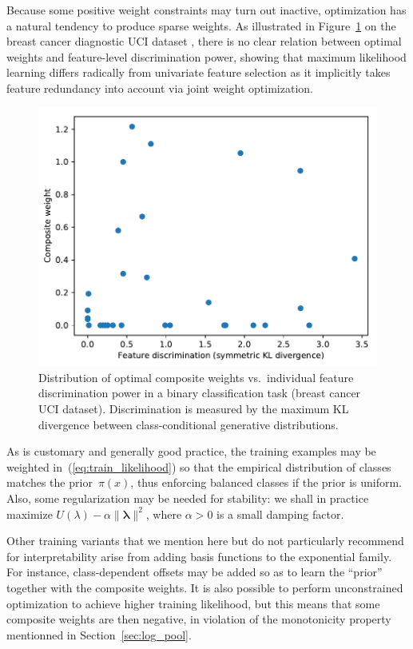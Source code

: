 \documentclass[english]{scrartcl}
\newcommand{\blambda}{{\boldsymbol{\lambda}}}
\begin{document}
Because some positive weight constraints may turn out inactive, optimization has a natural tendency to produce sparse weights. As illustrated in Figure~\ref{fig:disc_weight_plot} on the breast cancer diagnostic UCI dataset \cite{Wolberg-94}, there is no clear relation between optimal weights and feature-level discrimination power, showing that maximum likelihood learning differs radically from univariate feature selection as it implicitly takes feature redundancy into account via joint weight optimization.


\begin{figure}[!ht]
  \begin{center}
    \includegraphics[width=.6\textwidth]{disc_weight_plot.pdf}
  \end{center}
\caption{Distribution of optimal composite weights vs.~individual feature discrimination power in a binary classification task (breast cancer UCI dataset). Discrimination is measured by the maximum KL divergence between class-conditional generative distributions.}
\label{fig:disc_weight_plot}
\end{figure}

As is customary and generally good practice, the training examples may be weighted in~(\ref{eq:train_likelihood}) so that the empirical distribution of classes matches the prior~$\pi(x)$, thus enforcing balanced classes if the prior is uniform. Also, some regularization may be needed for stability: we shall in practice maximize $U(\lambda)-\alpha \|\blambda\|^2$, where $\alpha>0$ is a small damping factor.

Other training variants that we mention here but do not particularly recommend for interpretability arise from adding basis functions to the exponential family. For instance, class-dependent offsets may be added so as to learn the ``prior'' together with the composite weights. It is also possible to perform unconstrained optimization to achieve higher training likelihood, but this means that some composite weights are then negative, in violation of the monotonicity property mentionned in Section~\ref{sec:log_pool}.
\end{document}
